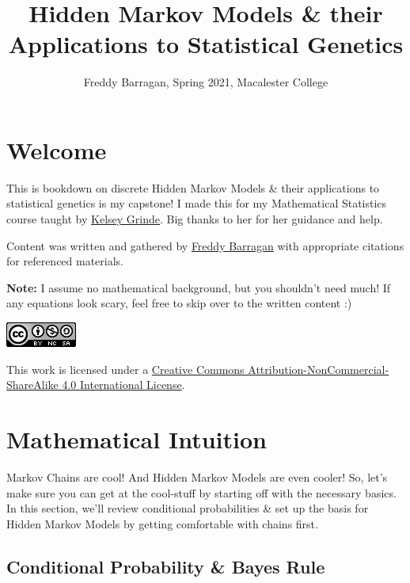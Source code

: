 \documentclass[
]{book}
\title{Hidden Markov Models \& their Applications to Statistical Genetics}
\author{Freddy Barragan, Spring 2021, Macalester College}
\date{}
\begin{document}
\maketitle

{
\setcounter{tocdepth}{1}
\tableofcontents
}
\hypertarget{welcome}{%
\chapter*{Welcome}\label{welcome}}

This is bookdown on discrete Hidden Markov Models \& their applications to statistical genetics is my capstone! I made this for my Mathematical Statistics course taught by \href{\%22http://kegrinde.github.io\%22}{Kelsey Grinde}. Big thanks to her for her guidance and help.

Content was written and gathered by \href{\%22https://freddybarragan.netlify.app\%22}{Freddy Barragan} with appropriate citations for referenced materials.

\textbf{Note:}
I assume no mathematical background, but you shouldn't need much! If any equations look scary, feel free to skip over to the written content :)

\includegraphics{images/cc_license_button.png}

This work is licensed under a \href{https://creativecommons.org/licenses/by-nc-sa/4.0/}{Creative Commons Attribution-NonCommercial-ShareAlike 4.0 International License}.

\hypertarget{mathematical-intuition}{%
\chapter{Mathematical Intuition}\label{mathematical-intuition}}

Markov Chains are cool! And Hidden Markov Models are even cooler! So, let's make sure you can get at the cool-stuff by starting off with the necessary basics. In this section, we'll review conditional probabilities \& set up the basis for Hidden Markov Models by getting comfortable with chains first.

\hypertarget{conditional-probability-bayes-rule}{%
\section{Conditional Probability \& Bayes Rule}\label{conditional-probability-bayes-rule}}
\end{document}
